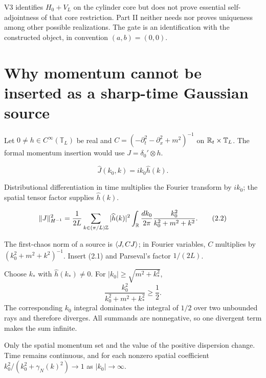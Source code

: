 \documentclass[11pt,a4paper]{article}
\newcommand{\T}{\mathbb T}
\begin{document}

\Because V3 identifies $H_0+V_L$ on the cylinder core but does not prove essential
self-adjointness of that core restriction.  Part II neither needs nor proves
uniqueness among other possible realizations.  The gate is an identification with
the constructed object, in convention $(a,b)=(0,0)$.

\QedStep

\section{Why momentum cannot be inserted as a sharp-time Gaussian source}


Let $0\ne h\in C^\infty(\T_L)$ be real and
$C=(-\partial_t^2-\partial_x^2+m^2)^{-1}$ on
$\R_t\times\T_L$.  The formal momentum insertion would use
$J=\delta_0'\otimes h$.

\[
 \widehat J(k_0,k)=ik_0\widehat h(k).
\tag{2.1}
\]

\Because Distributional differentiation in time multiplies the Fourier transform by
$ik_0$; the spatial tensor factor supplies $\widehat h(k)$.

\[
 \|J\|_{H^{-1}}^2
 =\frac1{2L}\sum_{k\in(\pi/L)\mathbb Z}|\widehat h(k)|^2
 \int_{\mathbb R}\frac{dk_0}{2\pi}
 \frac{k_0^2}{k_0^2+m^2+k^2}.
\tag{2.2}
\]

\Because The first-chaos norm of a source is
$\langle J,CJ\rangle$; in Fourier variables, $C$ multiplies by
$(k_0^2+m^2+k^2)^{-1}$.  Insert (2.1) and Parseval's factor $1/(2L)$.


\Because Choose $k_*$ with $\widehat h(k_*)\ne0$.  For
$|k_0|\ge\sqrt{m^2+k_*^2}$,
\[
 \frac{k_0^2}{k_0^2+m^2+k_*^2}\ge\frac12.
\]
The corresponding $k_0$ integral dominates the integral of $1/2$ over two
unbounded rays and therefore diverges.  All summands are nonnegative, so one
divergent term makes the sum infinite.


\Because Only the spatial momentum set and the value of the positive dispersion
change.  Time remains continuous, and for each nonzero spatial coefficient
$k_0^2/(k_0^2+\gamma_N(k)^2)\to1$ as $|k_0|\to\infty$.
\end{document}
